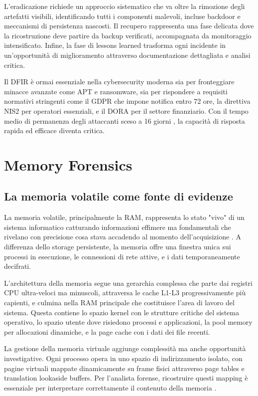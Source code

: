 L'eradicazione richiede un approccio sistematico che va oltre la rimozione degli artefatti visibili, identificando tutti i componenti malevoli, incluse backdoor e meccanismi di persistenza nascosti. Il recupero rappresenta una fase delicata dove la ricostruzione deve partire da backup verificati, accompagnata da monitoraggio intensificato. Infine, la fase di lessons learned trasforma ogni incidente in un'opportunità di miglioramento attraverso documentazione dettagliata e analisi critica.

Il DFIR è ormai essenziale nella cybersecurity moderna sia per fronteggiare minacce avanzate come APT e ransomware, sia per rispondere a requisiti normativi stringenti come il GDPR \cite{gdpr2016} che impone notifica entro 72 ore, la direttiva NIS2 \cite{nis2_2022} per operatori essenziali, e il DORA \cite{dora2022} per il settore finanziario. Con il tempo medio di permanenza degli attaccanti sceso a 16 giorni \cite{mandiant2023}, la capacità di risposta rapida ed efficace diventa critica.

\section{Memory Forensics}

\subsection{La memoria volatile come fonte di evidenze}

La memoria volatile, principalmente la RAM, rappresenta lo stato "vivo" di un sistema informatico catturando informazioni effimere ma fondamentali che rivelano con precisione cosa stava accadendo al momento dell'acquisizione \cite{ligh2014}. A differenza dello storage persistente, la memoria offre una finestra unica sui processi in esecuzione, le connessioni di rete attive, e i dati temporaneamente decifrati.

L'architettura della memoria segue una gerarchia complessa che parte dai registri CPU ultra-veloci ma minuscoli, attraversa le cache L1-L3 progressivamente più capienti, e culmina nella RAM principale che costituisce l'area di lavoro del sistema. Questa contiene lo spazio kernel con le strutture critiche del sistema operativo, lo spazio utente dove risiedono processi e applicazioni, la pool memory per allocazioni dinamiche, e la page cache con i dati dei file recenti.

La gestione della memoria virtuale aggiunge complessità ma anche opportunità investigative. Ogni processo opera in uno spazio di indirizzamento isolato, con pagine virtuali mappate dinamicamente su frame fisici attraverso page tables e translation lookaside buffers. Per l'analista forense, ricostruire questi mapping è essenziale per interpretare correttamente il contenuto della memoria \cite{case2017}.

